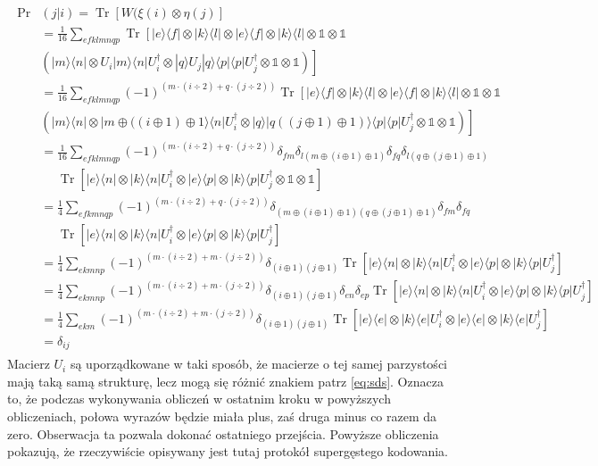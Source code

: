 \documentclass[10pt]{article} %
\DeclareMathOperator{\Trs}{Tr}
\newcommand{\Ket}[1]{|#1\rangle}
\newcommand{\Bra}[1]{\langle#1|}
\newcommand{\I}{\mathbb{1}}
\begin{document}
\begin{gather}
\label{eq:sds}
\begin{split}
\Pr&(j|i) = \Trs \left[ W (\xi(i) \otimes \eta(j)\right] \\
 &= \frac{1}{16}\sum_{efklmnqp} \Trs \left[\Ket{e}\Bra{f} \otimes \Ket{k}\Bra{l} \otimes \Ket{e}\Bra{f} \otimes  \Ket{k}\Bra{l} \otimes \I \otimes \I \right. \\&\left.\left( \Ket{m}\Bra{n} \otimes U_i\Ket{m}\Bra{n}U_i^\dag \otimes \Ket{q}U_j\Ket{q}\Bra{p}\Bra{p}U_j^\dag\otimes \I\otimes \I\right)\right] \\
&= \frac{1}{16} \sum_{efklmnqp} (-1)^{(m\cdot (i \div 2) + q \cdot (j \div 2))} \Trs\left[\Ket{e}\Bra{f} \otimes \Ket{k}\Bra{l} \otimes \Ket{e}\Bra{f} \otimes  \Ket{k}\Bra{l} \otimes \I \otimes \I \right. \\ & \left. \left( \Ket{m}\Bra{n} \otimes \Ket{m \oplus ((i \oplus 1) \oplus 1}\Bra{n}U_i^\dag \otimes \Ket{q}\Ket{q ((j \oplus 1) \oplus 1)}\Bra{p}\Bra{p}U_j^\dag\otimes \I\otimes \I\right)\right]\\
 &= \frac{1}{16} \sum_{efklmnqp}  (-1)^{(m\cdot (i \div 2) + q \cdot (j \div 2))} \delta_{fm}
\delta_{l(m \oplus (i \oplus 1) \oplus 1)}
\delta_{fq} 
\delta_{l(q \oplus (j \oplus 1) \oplus 1)}\\&~~~~~~ \Trs \left[ \Ket{e}\Bra{n} \otimes \Ket{k}\Bra{n}U_i^\dag\otimes \Ket{e}\Bra{p} \otimes \Ket{k}\Bra{p}U_j^\dag \otimes \I \otimes \I\right] \\
&=\frac{1}{4} \sum_{efkmnqp}  (-1)^{(m\cdot (i \div 2) + q \cdot (j \div 2))} \delta_{(m \oplus (i \oplus 1) \oplus 1)(q \oplus (j \oplus 1) \oplus 1)} \delta_{fm} \delta_{fq} \\& ~~~~~~\Trs \left [ \Ket{e}\Bra{n} \otimes \Ket{k}\Bra{n}U_i^\dag\otimes \Ket{e}\Bra{p} \otimes \Ket{k}\Bra{p}U_j^\dag \right] \\
&=  \frac{1}{4} \sum_{ekmnp}  (-1)^{(m\cdot (i \div 2) + m \cdot (j \div 2))} \delta_{(i \oplus 1)(j \oplus 1)} \Trs \left [ \Ket{e}\Bra{n} \otimes \Ket{k}\Bra{n}U_i^\dag\otimes \Ket{e}\Bra{p} \otimes \Ket{k}\Bra{p}U_j^\dag \right] \\
&= \frac{1}{4} \sum_{ekmnp}  (-1)^{(m\cdot (i \div 2) + m \cdot (j \div 2))} \delta_{(i \oplus 1)(j \oplus 1)} \delta_{en} \delta_{ep}   \Trs \left [ \Ket{e}\Bra{n} \otimes \Ket{k}\Bra{n}U_i^\dag\otimes \Ket{e}\Bra{p} \otimes \Ket{k}\Bra{p}U_j^\dag \right] \\
&= \frac{1}{4}\sum_{ekm} (-1)^{(m\cdot (i \div 2) + m \cdot (j \div 2))} \delta_{(i \oplus 1)(j \oplus 1)} \Trs \left [ \Ket{e}\Bra{e} \otimes \Ket{k}\Bra{e}U_i^\dag\otimes \Ket{e}\Bra{e} \otimes \Ket{k}\Bra{e}U_j^\dag \right] \\
&= \delta_{ij}
\end{split}
\end{gather} Macierz $U_i$ są uporządkowane w taki sposób, że macierze o tej samej parzystości mają taką samą strukturę, lecz mogą się różnić znakiem patrz \eqref{eq:sds}. Oznacza to, że podczas wykonywania obliczeń w ostatnim kroku w powyższych obliczeniach, połowa wyrazów będzie miała plus, zaś druga minus co razem da zero. Obserwacja ta pozwala dokonać ostatniego przejścia. Powyższe obliczenia pokazują, że rzeczywiście opisywany jest tutaj protokół supergęstego kodowania.
\end{document}
